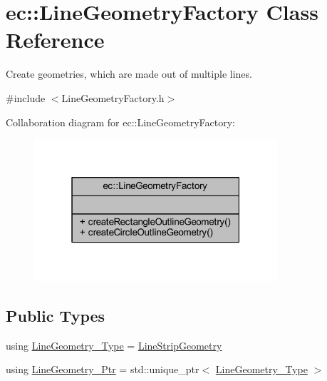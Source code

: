 \hypertarget{classec_1_1_line_geometry_factory}{}\section{ec\+:\+:Line\+Geometry\+Factory Class Reference}
\label{classec_1_1_line_geometry_factory}


Create geometries, which are made out of multiple lines.  




{\ttfamily \#include $<$Line\+Geometry\+Factory.\+h$>$}



Collaboration diagram for ec\+:\+:Line\+Geometry\+Factory\+:\nopagebreak
\begin{figure}[H]
\begin{center}
\leavevmode
\includegraphics[width=256pt]{classec_1_1_line_geometry_factory__coll__graph}
\end{center}
\end{figure}
\subsection*{Public Types}
\begin{DoxyCompactItemize}
\item 
using \mbox{\hyperlink{classec_1_1_line_geometry_factory_a3025abbbb9ff132e43d46b17f1381213}{Line\+Geometry\+\_\+\+Type}} = \mbox{\hyperlink{classec_1_1_line_strip_geometry}{Line\+Strip\+Geometry}}
\item 
using \mbox{\hyperlink{classec_1_1_line_geometry_factory_a8f7bd7480ebc0dbc77930d81dcb69678}{Line\+Geometry\+\_\+\+Ptr}} = std\+::unique\+\_\+ptr$<$ \mbox{\hyperlink{classec_1_1_line_geometry_factory_a3025abbbb9ff132e43d46b17f1381213}{Line\+Geometry\+\_\+\+Type}} $>$
\end{DoxyCompactItemize}
